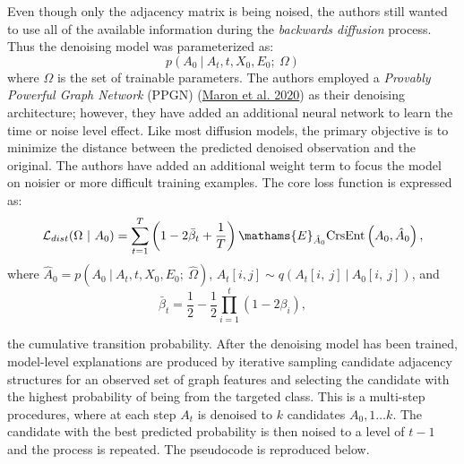 \documentclass[
  11pt,
  letterpaper,
]{article}
\begin{document}
\quad Even though only the adjacency matrix is being noised, the authors
still wanted to use all of the available information during the
\emph{backwards diffusion} process. Thus the denoising model was
parameterized as: \begin{equation}
         p(A_0 \ | \ A_t, t, X_0, E_0; \ \Omega)  
    \end{equation} where \(\Omega\) is the set of trainable parameters.
The authors employed a \emph{Provably Powerful Graph Network} (PPGN)
(\protect\hyperlink{ref-Maron_Ben-Hamu_Serviansky_Lipman_2020}{Maron et
al. 2020}) as their denoising architecture; however, they have added an
additional neural network to learn the time or noise level effect. Like
most diffusion models, the primary objective is to minimize the distance
between the predicted denoised observation and the original. The authors
have added an additional weight term to focus the model on noisier or
more difficult training examples. The core loss function is expressed
as: \begin{equation} \label{L-dist}
        \mathcal{L}_{dist} (\Omega \ | \ A_0) =  \sum_{t=1}^T 
            \left(1 - 2 \bar \beta_t + \dfrac 1 T \right)
            \mathams{E}_{\hat A_0}
            \text{CrsEnt} \left(
                A_0, \hat A_0
            \right), 
    \end{equation} where
\(\hat A_0 = p(A_0 \ | \ A_t, t, X_0, E_0; \ \hat \Omega)\),
\(A_t[i, j] \sim q(A_t[i, \ j] \ | \ A_{0}[i, \ j])\), and \[
    \bar \beta_t = \frac 1 2 - \frac 1 2 \prod^t_{i=1}(1-2\beta_i), 
\]

the cumulative transition probability. After the denoising model has
been trained, model-level explanations are produced by iterative
sampling candidate adjacency structures for an observed set of graph
features and selecting the candidate with the highest probability of
being from the targeted class. This is a multi-step procedures, where at
each step \(A_t\) is denoised to \(k\) candidates \(A_0, 1 \dots k\).
The candidate with the best predicted probability is then noised to a
level of \(t-1\) and the process is repeated. The pseudocode is
reproduced below.
\end{document}
